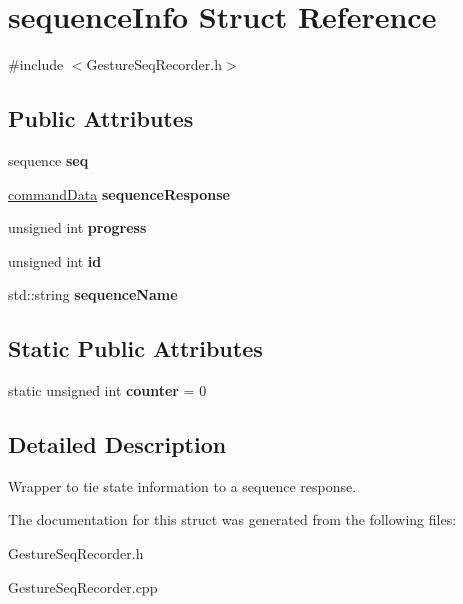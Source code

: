 \hypertarget{structsequence_info}{\section{sequence\+Info Struct Reference}
\label{structsequence_info}
}


{\ttfamily \#include $<$Gesture\+Seq\+Recorder.\+h$>$}

\subsection*{Public Attributes}
\begin{DoxyCompactItemize}
\item 
\hypertarget{structsequence_info_a50d6a6f2a36550816b9cc9bd507b72dc}{sequence {\bfseries seq}}\label{structsequence_info_a50d6a6f2a36550816b9cc9bd507b72dc}

\item 
\hypertarget{structsequence_info_a19a0599ecce102bd084becb5c5cebc75}{\hyperlink{structcommand_data}{command\+Data} {\bfseries sequence\+Response}}\label{structsequence_info_a19a0599ecce102bd084becb5c5cebc75}

\item 
\hypertarget{structsequence_info_a956782dc439d9305d4cf778f6e3aabef}{unsigned int {\bfseries progress}}\label{structsequence_info_a956782dc439d9305d4cf778f6e3aabef}

\item 
\hypertarget{structsequence_info_a361998ebf769619165f8e262ec46233a}{unsigned int {\bfseries id}}\label{structsequence_info_a361998ebf769619165f8e262ec46233a}

\item 
\hypertarget{structsequence_info_a2aae3803a2fabf36bf6fcb174f56f141}{std\+::string {\bfseries sequence\+Name}}\label{structsequence_info_a2aae3803a2fabf36bf6fcb174f56f141}

\end{DoxyCompactItemize}
\subsection*{Static Public Attributes}
\begin{DoxyCompactItemize}
\item 
\hypertarget{structsequence_info_a64458418e842fa396749afba2be7d30b}{static unsigned int {\bfseries counter} = 0}\label{structsequence_info_a64458418e842fa396749afba2be7d30b}

\end{DoxyCompactItemize}


\subsection{Detailed Description}
Wrapper to tie state information to a sequence response. 

The documentation for this struct was generated from the following files\+:\begin{DoxyCompactItemize}
\item 
Gesture\+Seq\+Recorder.\+h\item 
Gesture\+Seq\+Recorder.\+cpp\end{DoxyCompactItemize}
